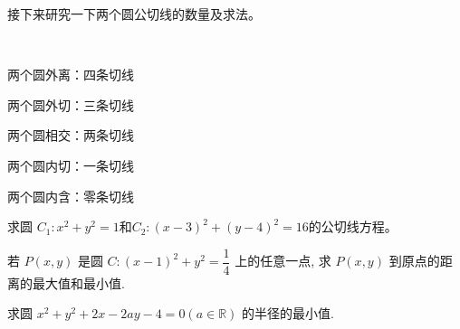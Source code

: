 接下来研究一下两个圆公切线的数量及求法。

\begin{theorem}[切线的数量]
\ 

    \begin{center}
        \begin{minipage}{0.3\textwidth} %
          \raggedright %
          两个圆外离：四条切线

       两个圆外切：三条切线

       两个圆相交：两条切线

       两个圆内切：一条切线

      两个圆内含：零条切线
        \end{minipage}
      \end{center}
\end{theorem}

\begin{example}
 求圆 $C_1:x^{2}+y^{2}=1 $和$C_2:(x-3)^{2}+(y-4)^{2}=16 $的公切线方程。
\end{example}



\clearpage



\clearpage
\review
\clearpage
\hw
\begin{homework}
    若 $ P(x, y) $ 是圆 $ C:(x-1)^{2}+y^{2}=\dfrac{1}{4}$  上的任意一点, 求 $ P(x, y) $ 到原点的距离的最大值和最小值.
\end{homework}
\begin{homework}
    求圆  $x^{2}+y^{2}+2 x-2 a y-4=0(a \in \mathbb{R})$  的半径的最小值.
\end{homework}
\begin{homework}
    
\end{homework}
\begin{homework}
    
\end{homework}
\begin{homework}
    
\end{homework}
\begin{homework}
    
\end{homework}
\begin{homework}
    
\end{homework}
\begin{homework}
    
\end{homework}
\begin{homework}
    
\end{homework}
\clearpage

